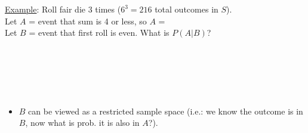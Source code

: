 \documentclass[11pt]{article}
\begin{document}
\noindent \underline{Example}:  Roll fair die 3 times ($6^{3} = 216$ total
outcomes in $S$). \\ Let $A$ = event that sum is 4 or less, so $A$ = \\
Let $B$ = event that first roll is even.  What is
$P(A|B)$? \\ \\ \\ \\ \\ \\
\begin{itemize}
\item $B$ can be viewed as a restricted sample space (i.e.: we know the
outcome is in $B$, now what is prob. it is also in $A$?).

\end{itemize}


\end{document}
